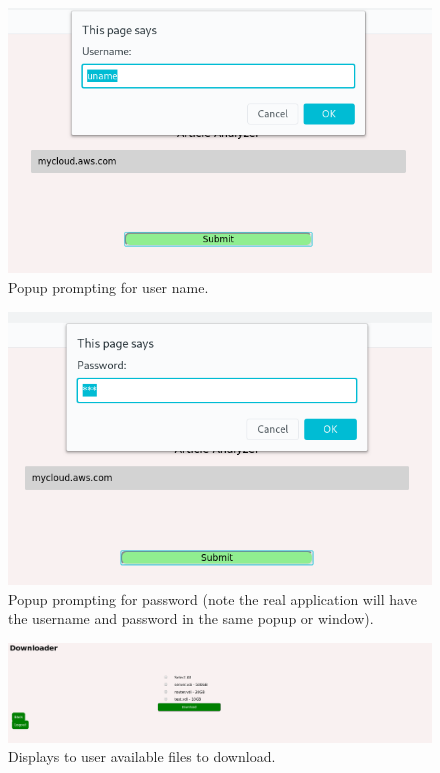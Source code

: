 \documentclass{article}
\begin{document}
    \begin{figure}[h]
    \includegraphics[scale=.55]{p5}
        \caption{Popup prompting for user name.}
    \end{figure}

    \begin{figure}[h]
    \includegraphics[scale=.55]{p6}
        \caption{Popup prompting for password (note the real application will have the username and password in the same popup or window).}
    \end{figure}

    \begin{figure}[h]
    \includegraphics[scale=.25]{p7}
        \caption{Displays to user available files to download.}
    \end{figure}
    
\end{document}

